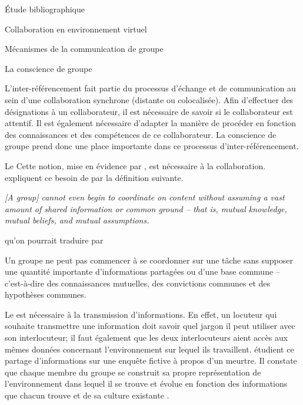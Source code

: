 \documentclass[myfrancais,ngerman,english,french]{mythesis}
\begin{document}
\begin{mychapter}{Étude bibliographique}
\begin{mysection}{Collaboration en environnement virtuel}
\begin{mysubsection}{Mécanismes de la communication de groupe}
\begin{mysubsubsection}{La conscience de groupe}
					\begin{myfigure}
					\end{myfigure}

					L'inter-référencement fait partie du processus d'échange et de communication au sein d'une collaboration synchrone (distante ou colocalisée).
					Afin d'effectuer des désignations à un collaborateur, il est nécessaire de savoir si le collaborateur est attentif.
					Il est également nécessaire d'adapter la manière de procéder en fonction des connaissances et des compétences de ce collaborateur.
					La conscience de groupe prend donc une place importante dans ce processus d'inter-référencement.
				\end{mysubsubsection}
				\begin{mysubsubsection}{Le \mygrounding}
					Cette notion, mise en évidence par , est nécessaire à la collaboration.
					 expliquent ce besoin de \mygrounding par la définition suivante.
					\begin{myquote}[english]
						\it [A group] cannot even begin to coordinate on content without assuming a vast amount of shared information or common ground -- that is, mutual knowledge, mutual beliefs, and mutual assumptions.
					\end{myquote}
					qu'on pourrait traduire par
					\begin{myquote}[french]
						Un groupe ne peut pas commencer à se coordonner sur une tâche sans supposer une quantité importante d'informations partagées ou d'une base commune -- c'est-à-dire des connaissances mutuelles, des convictions communes et des hypothèses communes.
					\end{myquote}

					Le \mygrounding est nécessaire à la transmission d'informations.
					En effet, un locuteur qui souhaite transmettre une information doit savoir quel jargon il peut utiliser avec son interlocuteur; il faut également que les deux interlocuteurs aient accès aux mêmes données concernant l'environnement sur lequel ils travaillent.
					 étudient ce partage d'informations sur une enquête fictive à propos d'un meurtre.
					Il constate que chaque membre du groupe se construit sa propre représentation de l'environnement dans lequel il se trouve et évolue en fonction des informations que chacun trouve et de sa culture existante .


\end{mysubsubsection}
\end{mysubsection}
\end{mysection}
\end{mychapter}
\end{document}
